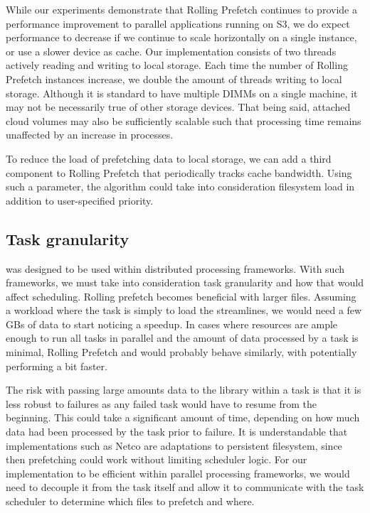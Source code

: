 \documentclass[conference]{IEEEtran}
\begin{document}
While our experiments demonstrate that Rolling Prefetch continues to provide a performance improvement to parallel
applications running on S3, we do expect  performance to decrease if we continue to scale horizontally on
a single instance, or use a slower device as cache. Our implementation consists of two threads actively reading and writing to local storage. Each time the number of Rolling
Prefetch instances increase, we double the amount of threads writing to local storage. Although it is standard
to have multiple DIMMs on a single machine, it may
not be necessarily true of other storage devices. That being said, attached cloud volumes may
also be sufficiently scalable such that processing time remains unaffected by an increase in processes.

To reduce the load of prefetching data to local storage, we can add a third component to Rolling Prefetch that periodically tracks cache bandwidth. Using such a parameter, the algorithm could take into consideration filesystem 
load in addition to user-specified priority.


\subsection{Task granularity}
\sfs was designed to be used within distributed processing frameworks. With such frameworks, we must take into consideration task granularity and how that would affect
scheduling. Rolling prefetch becomes beneficial with larger files. Assuming a workload where the task is simply to load the streamlines, we would need a few
GBs of data to start noticing a speedup. In cases where resources are ample enough to run all tasks in
parallel and the amount of data processed by a task is minimal, Rolling Prefetch and \sfs would probably behave
similarly, with \sfs potentially performing a bit faster.

The risk with passing large amounts data to the library within a task is that it is less robust to failures as any failed task would have to resume from the beginning. This could
take a significant amount of time, depending on how much data had been processed by the task prior to failure.
It is understandable that implementations such as Netco are adaptations to
persistent filesystem, since then prefetching could work without limiting scheduler logic. For our 
implementation to be efficient within parallel processing frameworks, we would need to decouple it from
the task itself and allow it to communicate with the task scheduler to determine which files to prefetch and
where.
\end{document}
